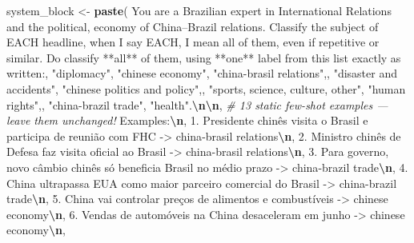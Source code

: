 \documentclass[
  12pt,
]{article}
\newenvironment{Shaded}{\begin{snugshade}}{\end{snugshade}}
\newcommand{\CommentTok}[1]{\textcolor[rgb]{0.56,0.35,0.01}{\textit{#1}}}
\newcommand{\FunctionTok}[1]{\textcolor[rgb]{0.13,0.29,0.53}{\textbf{#1}}}
\newcommand{\NormalTok}[1]{#1}
\newcommand{\OtherTok}[1]{\textcolor[rgb]{0.56,0.35,0.01}{#1}}
\newcommand{\SpecialCharTok}[1]{\textcolor[rgb]{0.81,0.36,0.00}{\textbf{#1}}}
\newcommand{\StringTok}[1]{\textcolor[rgb]{0.31,0.60,0.02}{#1}}
\begin{document}
\begin{Shaded}
\begin{Highlighting}[]
\NormalTok{system\_block }\OtherTok{\textless{}{-}} \FunctionTok{paste}\NormalTok{(}
  \StringTok{\textquotesingle{}You are a Brazilian expert in International Relations and the political\textquotesingle{}}\NormalTok{,}
  \StringTok{\textquotesingle{}economy of China–Brazil relations.  Classify the subject of EACH headline\textquotesingle{}}\NormalTok{,}
  \StringTok{\textquotesingle{}when I say EACH, I mean all of them, even if repetitive or similar. Do classify **all** of them\textquotesingle{}}\NormalTok{,}
  \StringTok{\textquotesingle{}using **one** label from this list exactly as written:\textquotesingle{}}\NormalTok{,}
  \StringTok{\textquotesingle{}"diplomacy", "chinese economy", "china{-}brasil relations",\textquotesingle{}}\NormalTok{,}
  \StringTok{\textquotesingle{}"disaster and accidents", "chinese politics and policy",\textquotesingle{}}\NormalTok{,}
  \StringTok{\textquotesingle{}"sports, science, culture, other", "human rights",\textquotesingle{}}\NormalTok{,}
  \StringTok{\textquotesingle{}"china{-}brazil trade", "health".}\SpecialCharTok{\textbackslash{}n\textbackslash{}n}\StringTok{\textquotesingle{}}\NormalTok{,}
  \CommentTok{\# 13 static few{-}shot examples — leave them unchanged!}
  \StringTok{\textquotesingle{}Examples:}\SpecialCharTok{\textbackslash{}n}\StringTok{\textquotesingle{}}\NormalTok{,}
  \StringTok{\textquotesingle{}1. Presidente chinês visita o Brasil e participa de reunião com FHC {-}\textgreater{} china{-}brasil relations}\SpecialCharTok{\textbackslash{}n}\StringTok{\textquotesingle{}}\NormalTok{,}
  \StringTok{\textquotesingle{}2. Ministro chinês de Defesa faz visita oficial ao Brasil {-}\textgreater{} china{-}brasil relations}\SpecialCharTok{\textbackslash{}n}\StringTok{\textquotesingle{}}\NormalTok{,}
  \StringTok{\textquotesingle{}3. Para governo, novo câmbio chinês só beneficia Brasil no médio prazo {-}\textgreater{} china{-}brazil trade}\SpecialCharTok{\textbackslash{}n}\StringTok{\textquotesingle{}}\NormalTok{,}
  \StringTok{\textquotesingle{}4. China ultrapassa EUA como maior parceiro comercial do Brasil {-}\textgreater{} china{-}brazil trade}\SpecialCharTok{\textbackslash{}n}\StringTok{\textquotesingle{}}\NormalTok{,}
  \StringTok{\textquotesingle{}5. China vai controlar preços de alimentos e combustíveis {-}\textgreater{} chinese economy}\SpecialCharTok{\textbackslash{}n}\StringTok{\textquotesingle{}}\NormalTok{,}
  \StringTok{\textquotesingle{}6. Vendas de automóveis na China desaceleram em junho {-}\textgreater{} chinese economy}\SpecialCharTok{\textbackslash{}n}\StringTok{\textquotesingle{}}\NormalTok{,}

\end{Highlighting}
\end{Shaded}
\end{document}
